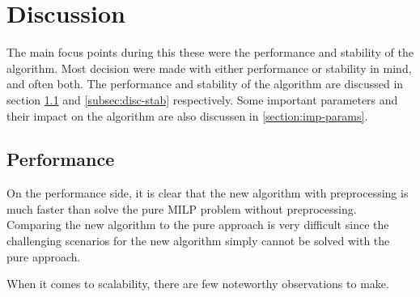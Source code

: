 \chapter{Discussion}
\label{section:discussion}
The main focus points during this these were the performance and stability of the algorithm. Most decision were made with either performance or stability in mind, and often both. The performance and stability of the algorithm are discussed in section \ref{subsec:disc-perf} and \ref{subsec:disc-stab} respectively. Some important parameters and their impact on the algorithm are also discussen in \ref{section:imp-params}.
\section{Performance}
\label{subsec:disc-perf}
On the performance side, it is clear that the new algorithm with preprocessing is much faster than solve the pure MILP problem without preprocessing. Comparing the new algorithm to the pure approach is very difficult since the challenging scenarios for the new algorithm simply cannot be solved with the pure approach.
\par
When it comes to scalability, there are few noteworthy observations to make. 
